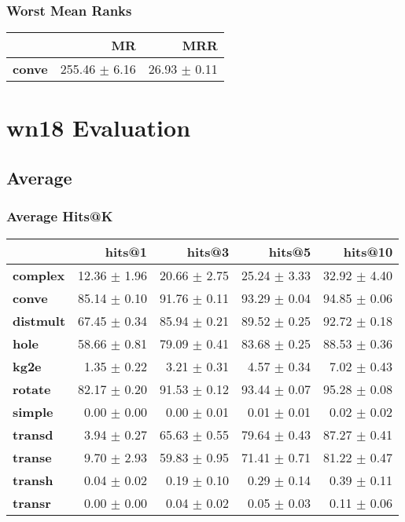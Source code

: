 \documentclass{article}
\begin{document}
    \subsubsection{Worst Mean Ranks}
    \begin{center}
    \begin{tabular}{lrr}
\toprule
{} &             MR &           MRR \\
\midrule
\textbf{conve} &  255.46 $\pm$ 6.16 &  26.93 $\pm$ 0.11 \\
\bottomrule
\end{tabular}

    \end{center}

\section{wn18 Evaluation}
    \subsection{Average}
    \subsubsection{Average Hits@K}
    \begin{center}
    \begin{tabular}{lrrrr}
\toprule
{} &        hits@1 &        hits@3 &        hits@5 &       hits@10 \\
\midrule
\textbf{complex } &  12.36 $\pm$ 1.96 &  20.66 $\pm$ 2.75 &  25.24 $\pm$ 3.33 &  32.92 $\pm$ 4.40 \\
\textbf{conve   } &  85.14 $\pm$ 0.10 &  91.76 $\pm$ 0.11 &  93.29 $\pm$ 0.04 &  94.85 $\pm$ 0.06 \\
\textbf{distmult} &  67.45 $\pm$ 0.34 &  85.94 $\pm$ 0.21 &  89.52 $\pm$ 0.25 &  92.72 $\pm$ 0.18 \\
\textbf{hole    } &  58.66 $\pm$ 0.81 &  79.09 $\pm$ 0.41 &  83.68 $\pm$ 0.25 &  88.53 $\pm$ 0.36 \\
\textbf{kg2e    } &   1.35 $\pm$ 0.22 &   3.21 $\pm$ 0.31 &   4.57 $\pm$ 0.34 &   7.02 $\pm$ 0.43 \\
\textbf{rotate  } &  82.17 $\pm$ 0.20 &  91.53 $\pm$ 0.12 &  93.44 $\pm$ 0.07 &  95.28 $\pm$ 0.08 \\
\textbf{simple  } &   0.00 $\pm$ 0.00 &   0.00 $\pm$ 0.01 &   0.01 $\pm$ 0.01 &   0.02 $\pm$ 0.02 \\
\textbf{transd  } &   3.94 $\pm$ 0.27 &  65.63 $\pm$ 0.55 &  79.64 $\pm$ 0.43 &  87.27 $\pm$ 0.41 \\
\textbf{transe  } &   9.70 $\pm$ 2.93 &  59.83 $\pm$ 0.95 &  71.41 $\pm$ 0.71 &  81.22 $\pm$ 0.47 \\
\textbf{transh  } &   0.04 $\pm$ 0.02 &   0.19 $\pm$ 0.10 &   0.29 $\pm$ 0.14 &   0.39 $\pm$ 0.11 \\
\textbf{transr  } &   0.00 $\pm$ 0.00 &   0.04 $\pm$ 0.02 &   0.05 $\pm$ 0.03 &   0.11 $\pm$ 0.06 \\
\bottomrule
\end{tabular}

    \end{center}
\end{document}
